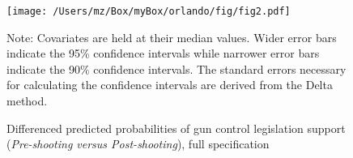 \begin{figure}
    \label{fig2}
    \begin{center}
    \caption{Differenced predicted probabilities of gun control legislation support (\emph{Pre-shooting versus Post-shooting}), full specification}
    \texttt{[image: /Users/mz/Box/myBox/orlando/fig/fig2.pdf]}
    \end{center}
    \scriptsize Note: Covariates are held at their median values. Wider error bars indicate the 95\% confidence intervals while narrower error bars indicate the 90\% confidence intervals. The standard errors necessary for calculating the confidence intervals are derived from the Delta method.
\end{figure}
